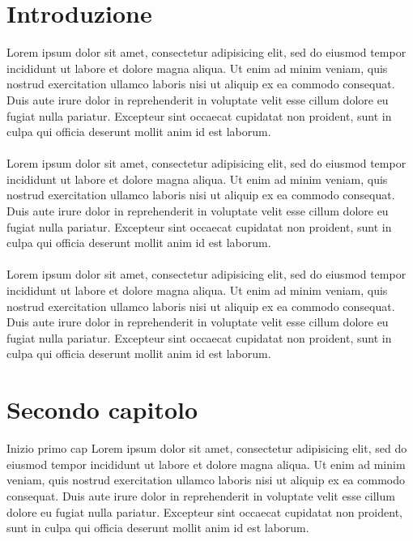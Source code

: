 \documentclass[11pt,a4paper]{article}
\begin{document}
\newpage
\section{Introduzione}
Lorem ipsum dolor sit amet, consectetur adipisicing elit, sed do eiusmod tempor incididunt ut labore et dolore magna aliqua. Ut enim ad minim veniam, quis nostrud exercitation ullamco laboris nisi ut aliquip ex ea commodo consequat. Duis aute irure dolor in reprehenderit in voluptate velit esse cillum dolore eu fugiat nulla pariatur. Excepteur sint occaecat cupidatat non proident, sunt in culpa qui officia deserunt mollit anim id est laborum.
\\ \\ %
Lorem ipsum dolor sit amet, consectetur adipisicing elit, sed do eiusmod tempor incididunt ut labore et dolore magna aliqua. Ut enim ad minim veniam, quis nostrud exercitation ullamco laboris nisi ut aliquip ex ea commodo consequat. Duis aute irure dolor in reprehenderit in voluptate velit esse cillum dolore eu fugiat nulla pariatur. Excepteur sint occaecat cupidatat non proident, sunt in culpa qui officia deserunt mollit anim id est laborum.
\\ \\
Lorem ipsum dolor sit amet, consectetur adipisicing elit, sed do eiusmod tempor incididunt ut labore et dolore magna aliqua. Ut enim ad minim veniam, quis nostrud exercitation ullamco laboris nisi ut aliquip ex ea commodo consequat. Duis aute irure dolor in reprehenderit in voluptate velit esse cillum dolore eu fugiat nulla pariatur. Excepteur sint occaecat cupidatat non proident, sunt in culpa qui officia deserunt mollit anim id est laborum.

\section{Secondo capitolo}
Inizio primo cap Lorem ipsum dolor sit amet, consectetur adipisicing elit, sed do eiusmod tempor incididunt ut labore et dolore magna aliqua. Ut enim ad minim veniam, quis nostrud exercitation ullamco laboris nisi ut aliquip ex ea commodo consequat. Duis aute irure dolor in reprehenderit in voluptate velit esse cillum dolore eu fugiat nulla pariatur. Excepteur sint occaecat cupidatat non proident, sunt in culpa qui officia deserunt mollit anim id est laborum.
\end{document}
